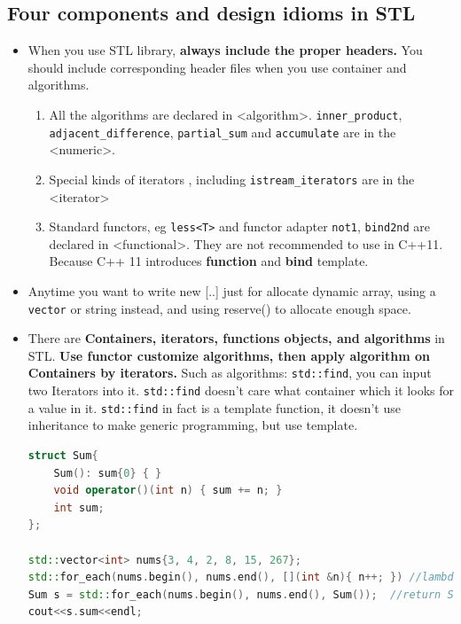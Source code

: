 \documentclass[a4paper,11pt,twoside]{book}
\begin{document}
\subsection{Four components and design idioms in STL}
\begin{itemize}
	\item When you use STL library, \textbf{always include the proper headers.} You should include corresponding header files when you use container and algorithms.
\begin{enumerate}

	\item All the algorithms are declared in <algorithm>. \texttt{inner\_product}, \texttt{adjacent\_difference}, \texttt{partial\_sum} and \texttt{accumulate} are in the <numeric>.

	\item Special kinds of iterators , including \texttt{istream\_iterators} are in the <iterator>

	\item Standard functors, eg \texttt{less<T>} and functor adapter \texttt{not1}, \texttt{bind2nd} are declared in <functional>. They are not recommended to use in C++11. Because C++ 11 introduces \textbf{function} and \textbf{bind} template.

\end{enumerate}

	\item Anytime you want to write new [..] just for allocate dynamic array, using a \texttt{vector} or string instead, and using reserve() to allocate enough space.


	\item There are \textbf{Containers, iterators, functions objects, and algorithms} in STL. \textbf{Use functor customize algorithms, then apply algorithm on Containers by iterators.} Such as algorithms: \texttt{std::find}, you can input two Iterators into it.  \texttt{std::find} doesn't care what container which it looks for a value in it.  \texttt{std::find} in fact is a template function, it doesn't use inheritance to make generic programming, but use template.  

\begin{lstlisting}[frame=single, language=c++]
struct Sum{
    Sum(): sum{0} { }
    void operator()(int n) { sum += n; }
    int sum;
};

std::vector<int> nums{3, 4, 2, 8, 15, 267};
std::for_each(nums.begin(), nums.end(), [](int &n){ n++; }) //lambda syntax
Sum s = std::for_each(nums.begin(), nums.end(), Sum());  //return Sum struct
cout<<s.sum<<endl;
\end{lstlisting}





\end{itemize}
\end{document}
